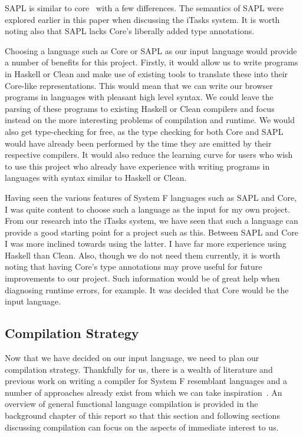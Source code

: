 SAPL is similar to core~\cite[pp.5]{SAPL2JS} with a few differences. 
The semantics of SAPL were explored earlier in this paper when discussing the 
iTasks system. It is worth noting also that SAPL lacks Core's liberally added
type annotations.

Choosing a language such as Core or SAPL as our input language would provide
a number of benefits for this project. Firstly, it would allow us to write
programs in Haskell or Clean and make use of existing tools to translate these
into their Core-like representations. This would mean that we can write our browser
programs in languages with pleasant high level syntax. We could leave the 
parsing of these programs to existing Haskell or Clean compilers and focus 
instead on the more interesting problems of compilation and runtime. We would
also get type-checking for free, as the type checking for both Core and SAPL 
would have already been performed by the time they are emitted by their respective
compilers. It would also reduce the learning curve for users who wish to use
this project who already have experience with writing programs in languages
with syntax similar to Haskell or Clean.
 
Having seen the various features of System F languages such as SAPL and Core, I
was quite content to choose such a language as the input for my own project. 
From our research into the iTasks system, we have seen that such a language 
can provide a good starting point for a project such as this. Between SAPL and
Core I was more inclined towards using the latter. I have far more experience
using Haskell than Clean. Also, though we do not need them currently, it is
worth noting that having Core's type annotations may prove useful for future
improvements to our project. Such information would be of great help when 
diagnosing runtime errors, for example. It was decided that Core would be the
input language.

\subsection{Compilation Strategy}
Now that we have decided on our input language, we need to plan our compilation
strategy. Thankfully for us, there is a wealth of literature and previous work
on writing a compiler for System F resemblant languages and a number of approaches
already exist from which we can take inspiration~\cite{Tutorial}. An overview of general 
functional language compilation is provided in the background chapter of this
report so that this section and following sections discussing compilation can 
focus on the aspects of immediate interest to us.


